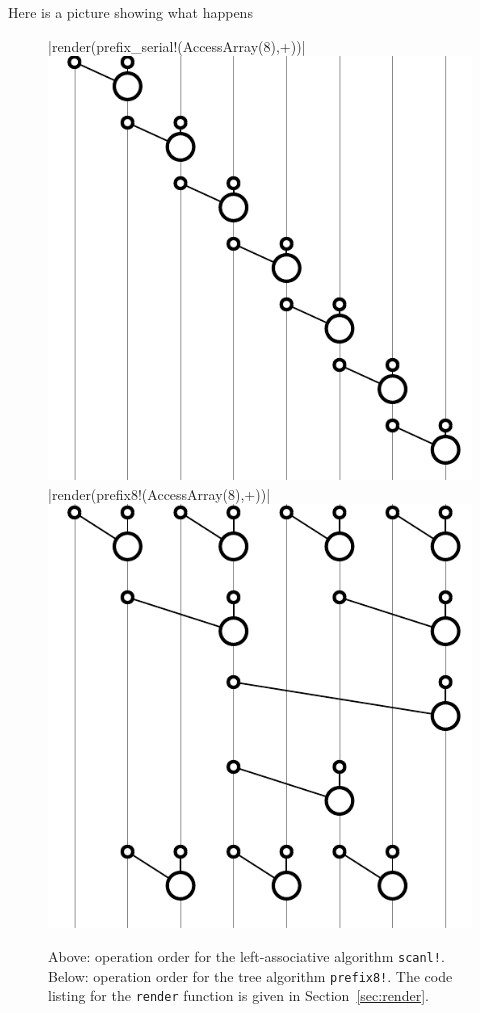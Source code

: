 \documentclass{sig-alternate}
\newcommand{\code}[1]{\texttt{#1}}
\begin{document}
Here is a picture showing what happens

\begin{figure}
  \centering

  |render(prefix_serial!(AccessArray(8),+))|
  \includegraphics{serial}
  \vspace{12 pt}
  |render(prefix8!(AccessArray(8),+))|
  \includegraphics{tree}
  \caption{Above: operation order for the left-associative algorithm \code{scanl!}.
           Below: operation order for the tree algorithm \code{prefix8!}.
           The code listing for the \code{render} function is given in Section~\ref{sec:render}.}
  \label{fig:gates}
\end{figure}
\end{document}
